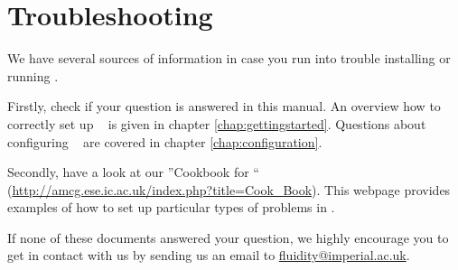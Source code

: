 \chapter{Troubleshooting}

We have several sources of information in case you run into trouble installing or running \fluidity.

Firstly, check if your question is answered in this manual. An overview how to correctly set up \fluidity \mbox{ } is given in chapter \ref{chap:gettingstarted}.
Questions about configuring \fluidity\mbox{ } are covered in chapter \ref{chap:configuration}.

Secondly, have a look at our ''Cookbook for \fluidity`` (\url{http://amcg.ese.ic.ac.uk/index.php?title=Cook_Book}). This webpage provides examples of how to set up particular types of problems in \fluidity. 

If none of these documents answered your question, we highly encourage you to get in contact with us by sending us an email to \url{fluidity@imperial.ac.uk}.
